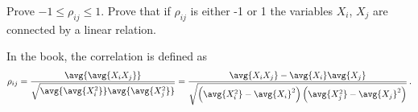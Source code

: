 

Prove $-1 \leq \rho_{ij} \leq 1$.
Prove that if $\rho_{ij}$ is either -1 or 1 the variables $X_i$, $X_j$ are connected by a linear relation.

In the book, the correlation is defined as
\begin{equation*}
\rho_{ij}
= \frac{\avg{\avg{X_i X_j}}}{\sqrt{\avg{\avg{X_i^2}} \avg{\avg{X_j^2}}}}
= \frac{\avg{X_i X_j}
- \avg{X_i}\avg{X_j}}{
\sqrt{\left(\avg{X_i^2} - \avg{X_i}^2 \right) \left( \avg{X_j^2} - \avg{X_j}^2 \right)}
} \, .
\end{equation*}

